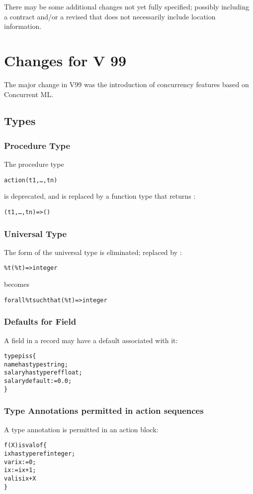 There may be some additional changes not yet fully specified; possibly including a  contract and/or a revised  that does not necessarily include location information.

\section{Changes for V 99}
The major change in V99 was the introduction of concurrency features based on Concurrent ML.

\subsection{Types}

\subsubsection{Procedure Type}
The procedure type
\begin{alltt}
action(t1,\ldots,tn)
\end{alltt}
is deprecated, and is replaced by a function type that returns \q{()}:
\begin{alltt}
(t1,\ldots,tn) => ()
\end{alltt}

\subsubsection{Universal Type}
The \tilda{} form of the universal type is eliminated; replaced by :
\begin{alltt}
\%t \tilda{} (\%t)=>integer
\end{alltt}
becomes
\begin{alltt}
for all \%t such that (\%t)=>integer
\end{alltt}

\subsubsection{Defaults for  Field}
A  field in a record may have a default associated with it:
\begin{alltt}
type p is s\{
  name has type string;
  salary has type ref float;
  salary default := 0.0;
\}
\end{alltt}

\subsubsection{Type Annotations permitted in action sequences}
A type annotation is permitted in an action block:
\begin{alltt}
f(X) is valof\{
  ix has type ref integer;
  var ix := 0;
  ix := ix+1;
  valis ix+X
\}
\end{alltt}

